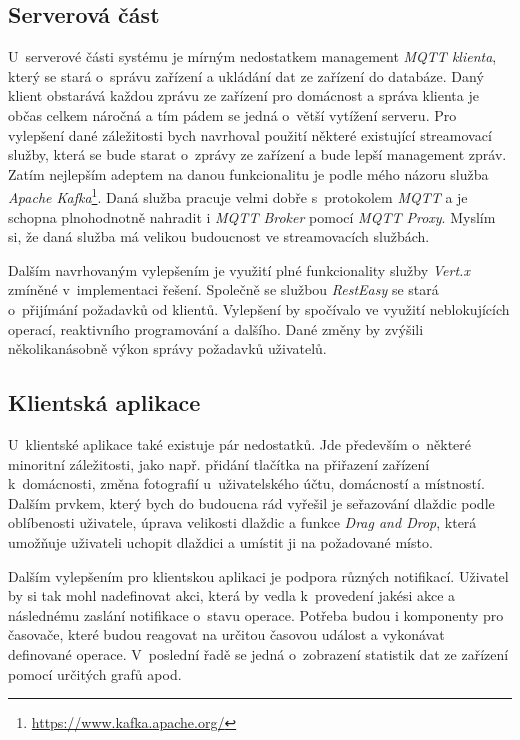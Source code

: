 \subsection*{Serverová část}
\label{testovani:navrh:server}
U~serverové části systému je mírným nedostatkem management \emph{MQTT klienta}, který se stará o~správu zařízení a ukládání dat ze zařízení do databáze.
Daný klient obstarává každou zprávu ze zařízení pro domácnost a správa klienta je občas celkem náročná a tím pádem se jedná o~větší vytížení serveru.
Pro vylepšení dané záležitosti bych navrhoval použití některé existující streamovací služby, která se bude starat o~zprávy ze zařízení a bude lepší management zpráv.
Zatím nejlepším adeptem na danou funkcionalitu je podle mého názoru služba \emph{Apache Kafka}\footnote{\url{https://www.kafka.apache.org/}}.
Daná služba pracuje velmi dobře s~protokolem \emph{MQTT} a je schopna plnohodnotně nahradit i \emph{MQTT Broker} pomocí \emph{MQTT Proxy}.
Myslím si, že daná služba má velikou budoucnost ve streamovacích službách.

Dalším navrhovaným vylepšením je využití plné funkcionality služby \emph{Vert.x} zmíněné v~implementaci řešení.
Společně se službou \emph{RestEasy} se stará o~přijímání požadavků od klientů.
Vylepšení by spočívalo ve využití neblokujících operací, reaktivního programování a dalšího.
Dané změny by zvýšili několikanásobně výkon správy požadavků uživatelů.

\subsection*{Klientská aplikace}
\label{testovani:navrh:frontend}
U~klientské aplikace také existuje pár nedostatků.
Jde především o~některé minoritní záležitosti, jako např. přidání tlačítka na přiřazení zařízení k~domácnosti, změna fotografií u~uživatelského účtu, domácností a místností.
Dalším prvkem, který bych do budoucna rád vyřešil je seřazování dlaždic podle oblíbenosti uživatele, úprava velikosti dlaždic a funkce \emph{Drag and Drop}, která umožňuje uživateli uchopit dlaždici a umístit ji na požadované místo.

Dalším vylepšením pro klientskou aplikaci je podpora různých notifikací.
Uživatel by si tak mohl nadefinovat akci, která by vedla k~provedení jakési akce a následnému zaslání notifikace o~stavu operace.
Potřeba budou i komponenty pro časovače, které budou reagovat na určitou časovou událost a vykonávat definované operace.
V~poslední řadě se jedná o~zobrazení statistik dat ze zařízení pomocí určitých grafů apod.

